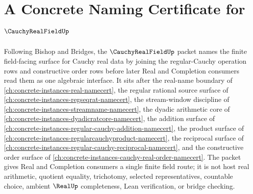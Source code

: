 \chapter{A Concrete Naming Certificate for $\CauchyRealFieldUp$}
\label{ch:concrete-instances-cauchy-real-field-namecert}

Following Bishop and Bridges, the $\CauchyRealFieldUp$ packet names the finite field-facing surface for Cauchy real data by joining the regular-Cauchy operation rows and constructive order rows before later Real and Completion consumers read them as one algebraic interface. It sits after the real-name boundary of \autoref{ch:concrete-instances-real-namecert}, the regular rational source surface of \autoref{ch:concrete-instances-regseqrat-namecert}, the stream-window discipline of \autoref{ch:concrete-instances-streamname-namecert}, the dyadic arithmetic core of \autoref{ch:concrete-instances-dyadicratcore-namecert}, the addition surface of \autoref{ch:concrete-instances-regular-cauchy-addition-namecert}, the product surface of \autoref{ch:concrete-instances-regularcauchyproduct-namecert}, the reciprocal surface of \autoref{ch:concrete-instances-regular-cauchy-reciprocal-namecert}, and the constructive order surface of \autoref{ch:concrete-instances-cauchy-real-order-namecert}. The packet gives Real and Completion consumers a single finite field route; it is not host real arithmetic, quotient equality, trichotomy, selected representatives, countable choice, ambient $\RealUp$ completeness, Lean verification, or bridge checking.

